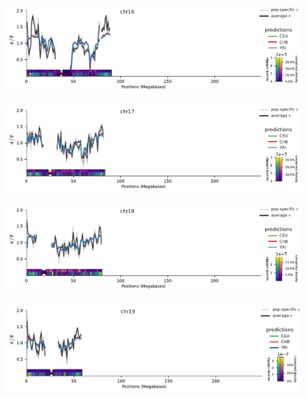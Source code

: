 \documentclass[11pt]{article}
\begin{document}
\begin{figure}[!htb]
  \centering
  \includegraphics[width=\textwidth]{figures/supplementary/pred_plot_chr16.pdf}
  \label{suppfig:fit-chr16}
\end{figure}


\begin{figure}[!htb]
  \centering
  \includegraphics[width=\textwidth]{figures/supplementary/pred_plot_chr17.pdf}
  \label{suppfig:fit-chr17}
\end{figure}


\begin{figure}[!htb]
  \centering
  \includegraphics[width=\textwidth]{figures/supplementary/pred_plot_chr18.pdf}
  \label{suppfig:fit-chr18}
\end{figure}


\begin{figure}[!htb]
  \centering
  \includegraphics[width=\textwidth]{figures/supplementary/pred_plot_chr19.pdf}
  \label{suppfig:fit-chr19}
\end{figure}
\end{document}
